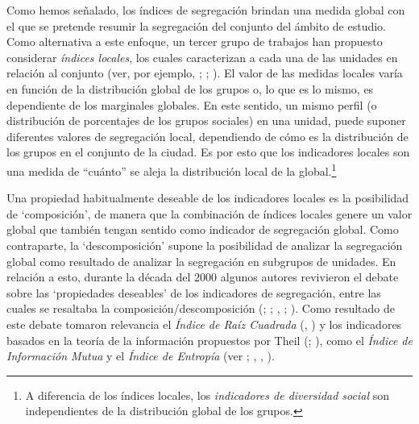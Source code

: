 \documentclass[
  spanish,
  a4paper,%
  chapterprefix=true,%
  DIV=calc,%
  twoside]{scrbook}%
\begin{document}
Como hemos señalado, los índices de segregación brindan una medida
global con el que se pretende resumir la segregación del conjunto del
ámbito de estudio. Como alternativa a este enfoque, un tercer grupo de
trabajos han propuesto considerar \emph{índices locales}, los cuales
caracterizan a cada una de las unidades en relación al conjunto (ver,
por ejemplo, ; ; ). El valor de las
medidas locales varía en función de la distribución global de los grupos
o, lo que es lo mismo, es dependiente de los marginales globales. En
este sentido, un mismo perfil (o distribución de porcentajes de los
grupos sociales) en una unidad, puede suponer diferentes valores de
segregación local, dependiendo de cómo es la distribución de los grupos
en el conjunto de la ciudad. Es por esto que los indicadores locales son
una medida de ``cuánto'' se aleja la distribución local de la
global.\footnote{A diferencia de
  los índices locales, los \emph{indicadores de diversidad social} son
  independientes de la distribución global de los grupos.}

Una propiedad habitualmente deseable de los
indicadores locales es la posibilidad de `composición', de manera que la
combinación de índices locales genere un valor global que también tengan
sentido como indicador de segregación global. Como contraparte, la
`descomposición' supone la posibilidad de analizar la segregación global
como resultado de analizar la segregación en subgrupos de unidades. En
relación a esto, durante la década del 2000 algunos autores revivieron
el debate sobre las `propiedades deseables' de los indicadores de
segregación, entre las cuales se resaltaba la composición/descomposición
(; ; , ; ).
Como resultado de este debate tomaron relevancia el \emph{Índice de Raíz
Cuadrada} (, ) y los indicadores basados en la
teoría de la información propuestos por Theil (; ), como el \emph{Índice de Información Mutua} y el \emph{Índice de
Entropía} (ver ; , , ).
\end{document}
